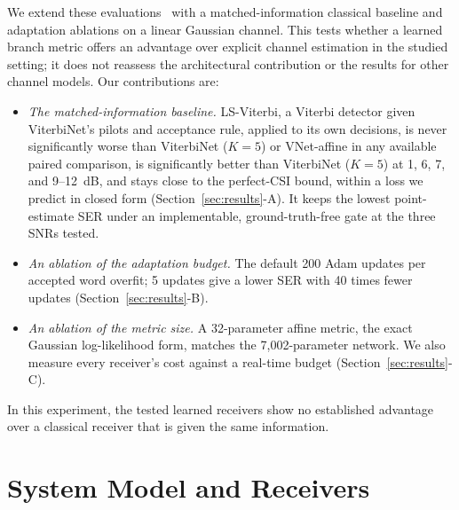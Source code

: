 \documentclass[journal]{IEEEtran}
\begin{document}
We extend these evaluations~\cite{shlezinger2020viterbinet,raviv2021metaviterbinet,raviv2023online} with a matched-information classical baseline and adaptation ablations on a linear Gaussian channel. This tests whether a learned branch metric offers an advantage over explicit channel estimation in the studied setting; it does not reassess the architectural contribution or the results for other channel models. Our contributions are:
\begin{itemize}
\item \emph{The matched-information baseline.} LS-Viterbi, a Viterbi detector given ViterbiNet's pilots and acceptance rule, applied to its own decisions, is never significantly worse than ViterbiNet ($K=5$) or VNet-affine in any available paired comparison, is significantly better than ViterbiNet ($K=5$) at 1, 6, 7, and 9--12~dB, and stays close to the perfect-CSI bound, within a loss we predict in closed form (Section~\ref{sec:results}-A). It keeps the lowest point-estimate SER under an implementable, ground-truth-free gate at the three SNRs tested.
\item \emph{An ablation of the adaptation budget.} The default 200 Adam updates per accepted word overfit; 5 updates give a lower SER with 40 times fewer updates (Section~\ref{sec:results}-B).
\item \emph{An ablation of the metric size.} A 32-parameter affine metric, the exact Gaussian log-likelihood form, matches the 7,002-parameter network. We also measure every receiver's cost against a real-time budget (Section~\ref{sec:results}-C).
\end{itemize}
In this experiment, the tested learned receivers show no established advantage over a classical receiver that is given the same information.

\section{System Model and Receivers}\label{sec:model}
\end{document}
